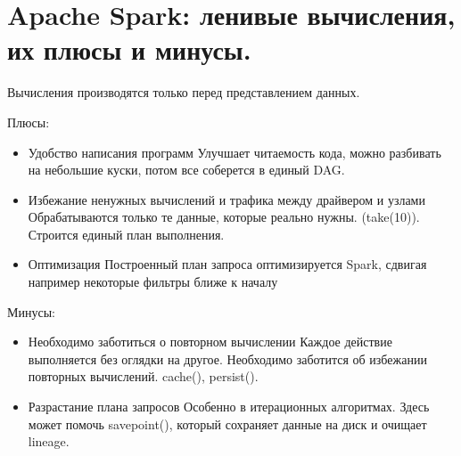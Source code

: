 \section{Apache Spark: ленивые вычисления, их плюсы и минусы.}

Вычисления производятся только перед представлением данных.

Плюсы:
\begin{itemize}
    \item Удобство написания программ
    Улучшает читаемость кода, можно разбивать на небольшие 
    куски, потом все соберется в единый DAG.
    \item Избежание ненужных вычислений и трафика между драйвером и 
    узлами
    Обрабатываются только те данные, которые реально нужны. 
    (take(10)). Строится единый план выполнения.
    \item Оптимизация
    Построенный план запроса оптимизируется Spark, сдвигая 
    например некоторые фильтры ближе к началу
\end{itemize}

Минусы:
\begin{itemize}
    \item Необходимо заботиться о повторном вычислении
    Каждое действие выполняется без оглядки на другое. 
    Необходимо заботится об избежании повторных вычислений. 
    cache(), persist().
    \item Разрастание плана запросов
    Особенно в итерационных алгоритмах. Здесь может помочь 
    savepoint(), который сохраняет данные на диск и очищает lineage.
\end{itemize}
